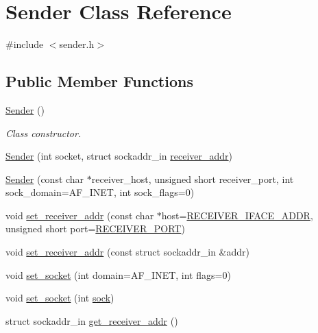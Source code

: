 \hypertarget{classSender}{}\section{Sender Class Reference}
\label{classSender}


{\ttfamily \#include $<$sender.\+h$>$}

\subsection*{Public Member Functions}
\begin{DoxyCompactItemize}
\item 
\hyperlink{classSender_ae14150bc5755bf478a7ad1904c017ba1}{Sender} ()\hypertarget{classSender_ae14150bc5755bf478a7ad1904c017ba1}{}\label{classSender_ae14150bc5755bf478a7ad1904c017ba1}

\begin{DoxyCompactList}\small\item\em Class constructor. \end{DoxyCompactList}\item 
\hyperlink{classSender_a5cd264b370a787a72739587aa8752004}{Sender} (int socket, struct sockaddr\+\_\+in \hyperlink{classSender_a4b1e281b5b86c9e899e46d4e12269dc7}{receiver\+\_\+addr})
\item 
\hyperlink{classSender_a84c28b0127e73e519a8713a7aa070327}{Sender} (const char $\ast$receiver\+\_\+host, unsigned short receiver\+\_\+port, int sock\+\_\+domain=A\+F\+\_\+\+I\+N\+ET, int sock\+\_\+flags=0)
\item 
void \hyperlink{classSender_a45f977589e7c0af7a557b9f29a47aa8b}{set\+\_\+receiver\+\_\+addr} (const char $\ast$host=\hyperlink{protocol_8h_a03882e8e162387e0e8adcddd9f7249ab}{R\+E\+C\+E\+I\+V\+E\+R\+\_\+\+I\+F\+A\+C\+E\+\_\+\+A\+D\+DR}, unsigned short port=\hyperlink{protocol_8h_a714d0c166e470fe1d95e17305a084931}{R\+E\+C\+E\+I\+V\+E\+R\+\_\+\+P\+O\+RT})
\item 
void \hyperlink{classSender_a68ac5477ee2f8406a778b3611b6bffaf}{set\+\_\+receiver\+\_\+addr} (const struct sockaddr\+\_\+in \&addr)
\item 
void \hyperlink{classSender_a6a151617c58294bc35904be60f8a067f}{set\+\_\+socket} (int domain=A\+F\+\_\+\+I\+N\+ET, int flags=0)
\item 
void \hyperlink{classSender_a19d2ffec5053ab10b10120cdb53e0cac}{set\+\_\+socket} (int \hyperlink{classSender_acfedab82d977e97e9424fb95f13d347d}{sock})
\item 
struct sockaddr\+\_\+in \hyperlink{classSender_ad89449f704a8a6fb1d2d80116d13e54c}{get\+\_\+receiver\+\_\+addr} ()\hypertarget{classSender_ad89449f704a8a6fb1d2d80116d13e54c}{}\label{classSender_ad89449f704a8a6fb1d2d80116d13e54c}


\end{DoxyCompactItemize}
